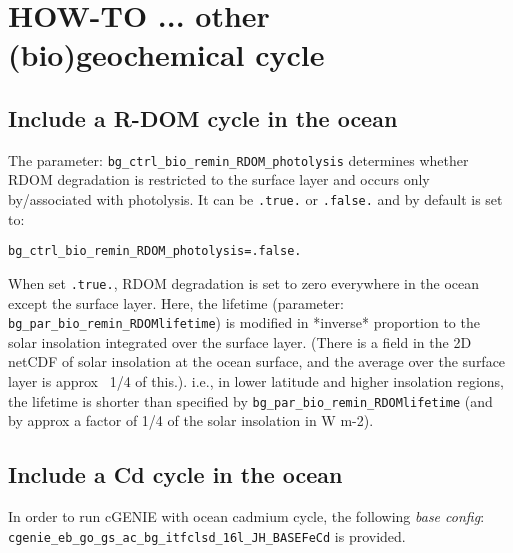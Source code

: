 \documentclass[11pt,fleqn]{book} %
\begin{document}

\newpage


\section{HOW-TO ...  other (bio)geochemical cycle}

\hfill \break

%
\newpage
\subsection*{Include a R-DOM cycle in the ocean}
\vspace{1mm}

The parameter: \texttt{bg\_ctrl\_bio\_remin\_RDOM\_photolysis} determines whether RDOM degradation is restricted to the surface layer and occurs only by/associated with photolysis. It can be \texttt{.true.} or \texttt{.false.} and by default is set to:
\vspace{-2pt}\begin{verbatim}
bg_ctrl_bio_remin_RDOM_photolysis=.false.
\end{verbatim}\vspace{-2pt}
When set \texttt{.true.}, RDOM degradation is set to zero everywhere in the ocean except the surface layer. Here, the lifetime (parameter: \texttt{bg\_par\_bio\_remin\_RDOMlifetime}) is modified in *inverse* proportion to the solar insolation integrated over the surface layer. (There is a field in the 2D netCDF of solar insolation at the ocean surface, and the average over the surface layer is approx ~1/4 of this.). i.e., in lower latitude and higher insolation regions, the lifetime is shorter than specified by \texttt{bg\_par\_bio\_remin\_RDOMlifetime} (and by approx a factor of 1/4 of the solar insolation in W m-2).

%
\newpage
\subsection*{Include a Cd cycle in the ocean}
\vspace{1mm}

In order to run cGENIE with ocean cadmium cycle, the following \textit{base config}: \\
\texttt{cgenie\_eb\_go\_gs\_ac\_bg\_itfclsd\_16l\_JH\_BASEFeCd} is provided.
\end{document}
